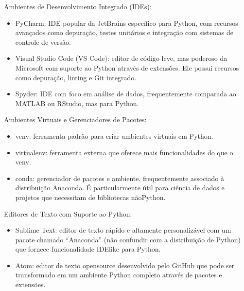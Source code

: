 \documentclass[letterpaper,10pt,english]{jupyterBook}
\begin{document}
\sphinxAtStartPar
Ambientes de Desenvolvimento Integrado (IDEs):
\begin{itemize}
\item {} 
\sphinxAtStartPar
PyCharm: IDE popular da JetBrains específico para Python, com recursos avançados como depuração, testes unitários e integração com sistemas de controle de versão.

\item {} 
\sphinxAtStartPar
Visual Studio Code (VS Code): editor de código leve, mas poderoso da Microsoft com suporte ao Python através de extensões. Ele possui recursos como depuração, linting e Git integrado.

\item {} 
\sphinxAtStartPar
Spyder: IDE com foco em análise de dados, frequentemente comparada ao MATLAB ou RStudio, mas para Python.

\end{itemize}

\sphinxAtStartPar
Ambientes Virtuais e Gerenciadores de Pacotes:
\begin{itemize}
\item {} 
\sphinxAtStartPar
venv: ferramenta padrão para criar ambientes virtuais em Python.

\item {} 
\sphinxAtStartPar
virtualenv: ferramenta externa que oferece mais funcionalidades do que o venv.

\item {} 
\sphinxAtStartPar
conda: gerenciador de pacotes e ambiente, frequentemente associado à distribuição Anaconda. É particularmente útil para ciência de dados e projetos que necessitam de bibliotecas não\sphinxhyphen{}Python.

\end{itemize}

\sphinxAtStartPar
Editores de Texto com Suporte ao Python:
\begin{itemize}
\item {} 
\sphinxAtStartPar
Sublime Text: editor de texto rápido e altamente personalizável com um pacote chamado “Anaconda” (não confundir com a distribuição de Python) que fornece funcionalidade IDE\sphinxhyphen{}like para Python.

\item {} 
\sphinxAtStartPar
Atom: editor de texto open\sphinxhyphen{}source desenvolvido pelo GitHub que pode ser transformado em um ambiente Python completo através de pacotes e extensões.

\end{itemize}
\end{document}
